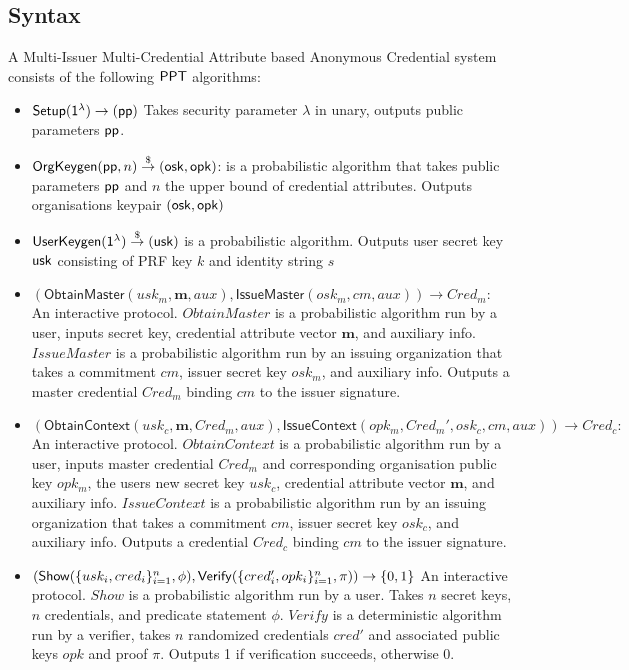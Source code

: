 \subsection{Syntax}
\begin{definition} A Multi-Issuer Multi-Credential Attribute based Anonymous Credential system consists of the following $\mathsf{PPT}$ algorithms:
    \begin{itemize}
    \item $\mathsf{Setup}(\mathsf{1^{\lambda}}) \to (\mathsf{pp})$ Takes security parameter $\lambda$ in unary, outputs public parameters $\mathsf{pp}$.

    \item $\mathsf{OrgKeygen}(\mathsf{pp}, n) \stackrel{\$}{\to} (\mathsf{osk}, \mathsf{opk})$: is a probabilistic algorithm that takes public parameters $\mathsf{pp}$ and $n$ the upper bound of credential attributes. Outputs organisations keypair $(\mathsf{osk}, \mathsf{opk})$

    \item $\mathsf{UserKeygen}(\mathsf{1^{\lambda}}) \stackrel{\$}{\to} (\mathsf{usk})$ is a probabilistic algorithm. Outputs user secret key $\mathsf{usk}$ consisting of PRF key $k$ and identity string $s$

    \item $(\mathsf{Obtain Master}(usk_m, \textbf{m}, aux), \mathsf{IssueMaster}(osk_m, cm, aux)) \to Cred_m:$ An interactive protocol. $Obtain Master$ is a probabilistic algorithm run by a user, inputs secret key, credential attribute vector $\textbf{m}$, and auxiliary info. $Issue Master$ is a probabilistic algorithm run by an issuing organization that takes a commitment $cm$, issuer secret key $osk_m$, and auxiliary info. Outputs a master credential $Cred_m$ binding $cm$ to the issuer signature.
    
    \item $(\mathsf{Obtain Context}(usk_c, \textbf{m}, Cred_m, aux), \mathsf{Issue Context}(opk_m, Cred_m', osk_c, cm, aux)) \to Cred_c:$ An interactive protocol. $Obtain Context$ is a probabilistic algorithm run by a user, inputs master credential $Cred_m$ and corresponding organisation public key $opk_m$, the users new secret key $usk_c$, credential attribute vector $\textbf{m}$, and auxiliary info. $Issue Context$ is a probabilistic algorithm run by an issuing organization that takes a commitment $cm$, issuer secret key $osk_c$, and auxiliary info. Outputs a credential $Cred_c$ binding $cm$ to the issuer signature.

    \item $(\mathsf{Show}(\{usk_i, cred_i\}_{i=1}^n, \phi), \mathsf{Verify}(\{cred'_i, opk_i\}_{i=1}^n, \pi)) \to \{0,1\}$ An interactive protocol. $Show$ is a probabilistic algorithm run by a user. Takes $n$ secret keys, $n$ credentials, and predicate statement $\phi$. $Verify$ is a deterministic algorithm run by a verifier, takes $n$ randomized credentials $cred'$ and associated public keys $opk$ and proof $\pi$. Outputs 1 if verification succeeds, otherwise 0.
\end{itemize}
\end{definition}



